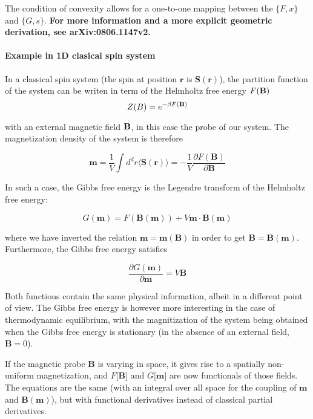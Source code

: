 \documentclass[11pt]{article} %
\newcommand{\1}{{\rm 1\hspace*{-0.38ex}%
\rule{0.1ex}{1.52ex}\hspace*{0.2ex}}}
\newcommand{\avg}[1]{\langle #1 \rangle}
\newcommand{\partialdel}[2]{\frac{\del #1}{\del #2}}
\newcommand{\del} {\partial}
\begin{document}
The condition of convexity allows for a one-to-one mapping between the  $\{F,x\} $ and $ \{G,s\}$. \textbf{ \lbrack For more information and a more explicit geometric derivation, see arXiv:0806.1147v2. \rbrack}

\paragraph{Example in 1D clasical spin system}

In a classical spin system (the spin at position $\textbf{r}$ is $\textbf{S}(\textbf{r})$), the partition function of the system can be writen in term of the Helmholtz free energy $F(\bf{B})$
\begin{equation}
Z(B)=e^{-\beta F(\bf{B})}
\end{equation}

with an external magnetic field $\bf{B}$, in this case the probe of our system. The magnetization density of the system is therefore

\begin{equation}
\textbf{m} =\frac{1}{V} \int d^d r \avg{\textbf{S}(\textbf{r})} = - \frac{1}{V} \partialdel{F(\textbf{B})}{\textbf{B}} 
\end{equation}

In such a case, the Gibbs free energy is the Legendre transform of the Helmholtz free energy:

\begin{equation}
G(\textbf{m})=F(\textbf{B}(\textbf{m})) + V \textbf{m} \cdot  \textbf{B}(\textbf{m})
\end{equation}

where we have inverted the relation $\textbf{m}=\textbf{m}(\textbf{B})$ in order to get $\textbf{B}=\textbf{B}(\textbf{m})$. Furthermore, the Gibbs free energy satisfies

\begin{equation}
\partialdel{G(\textbf{m})}{\textbf{m}}=V\textbf{B}
\end{equation}

Both functions contain the same physical information, albeit in a different point of view. The Gibbs free energy is however more interesting in the case of thermodynamic equilibrium, with the magnitization of the system being obtained when the Gibbs free energy is stationary (in the absence of an external field, $\textbf{B}=0$). 

If the magnetic probe $\textbf{B}$ is varying in space, it gives rise to a spatially non-uniform magnetization, and  $F\lbrack \textbf{B}\rbrack$ and $G\lbrack \textbf{m}\rbrack$ are now functionals of those fields. The equations are the same (with an integral over all space for the coupling of $\textbf{m}$ and $\textbf{B}(\textbf{m})$), but with functional derivatives instead of classical partial derivatives. 
\end{document}
